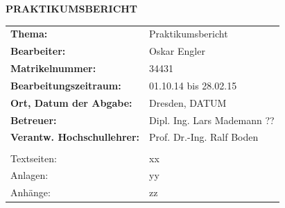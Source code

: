 \documentclass[a4paper,10pt, titlepage]{scrreprt}
\begin{document}
\begin{titlepage}
\begin{center}
\vspace{2 cm}
\huge\textbf{PRAKTIKUMSBERICHT}
\vspace{2 cm}
\end{center}

\begin{tabular}{lL{7cm}}
\Large\textbf{Thema:} & \Large{Praktikumsbericht}\\
\Large\textbf{Bearbeiter:} & \Large{Oskar Engler}\\
\Large\textbf{Matrikelnummer:} & \Large{34431}\\
\Large\textbf{Bearbeitungszeitraum:} & \Large{01.10.14 bis 28.02.15}\\
\Large\textbf{Ort, Datum der Abgabe:} & \Large{Dresden, DATUM}\\
\Large\textbf{Betreuer:} & \Large{Dipl. Ing. Lars Mademann ??}\\
\Large\textbf{Verantw. Hochschullehrer:} \hspace{1 cm} & \Large{Prof. Dr.-Ing. Ralf Boden}\\
\vspace{1 cm}\\
\large{Textseiten:} & \large{xx}\\
\large{Anlagen:} & \large{yy}\\
\large{Anhänge:} & \large{zz}\\
\end{tabular}

\end{titlepage}
\linespread{1.5}

\fancyhf{}

\thispagestyle{fancy}

\pagebreak 




\pagestyle{fancy} %

\renewcommand{\headrulewidth}{0.5pt}				%

\fancyfoot[R]{\thepage} 							%
\fancyfoot[L]{\nouppercase{\leftmark}}							%
\renewcommand{\chaptermark}[1]{\markboth{\thechapter.~\chaptername: #1}{}}	%

\setcounter{page}{1}




\end{document}
